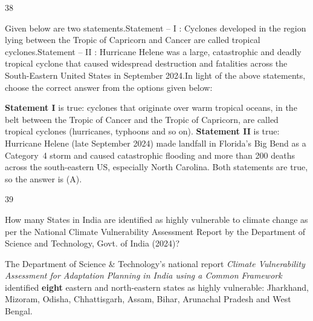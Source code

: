 \begin{question}{38}
{Given below are two statements.\newline Statement -- I : Cyclones developed in the region lying between the Tropic of Capricorn and Cancer are called tropical cyclones.\newline Statement -- II : Hurricane Helene was a large, catastrophic and deadly tropical cyclone that caused widespread destruction and fatalities across the South-Eastern United States in September 2024.\newline In light of the above statements, choose the correct answer from the options given below:\par}
\begin{explain}
\textbf{Statement I} is true: cyclones that originate over warm tropical oceans, in the belt between the Tropic of Cancer and the Tropic of Capricorn, are called tropical cyclones (hurricanes, typhoons and so on).
\textbf{Statement II} is true: Hurricane Helene (late September 2024) made landfall in Florida's Big Bend as a Category~4 storm and caused catastrophic flooding and more than 200 deaths across the south-eastern US, especially North Carolina.
Both statements are true, so the answer is (A).
\end{explain}
\end{question}

\begin{question}{39}
{How many States in India are identified as highly vulnerable to climate change as per the National Climate Vulnerability Assessment Report by the Department of Science and Technology, Govt. of India (2024)?\par}
\begin{explain}
The Department of Science \& Technology's national report \emph{Climate Vulnerability Assessment for Adaptation Planning in India using a Common Framework} identified \textbf{eight} eastern and north-eastern states as highly vulnerable: Jharkhand, Mizoram, Odisha, Chhattisgarh, Assam, Bihar, Arunachal Pradesh and West Bengal.
\end{explain}
\end{question}

